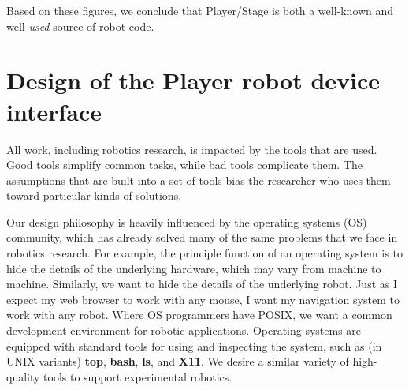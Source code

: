 
Based on these figures, we conclude that Player/Stage is both a
well-known and well-{\it used} source of robot code.

\section{Design of the Player robot device interface}
All work, including robotics research, is impacted by the tools that
are used. Good tools simplify common tasks, while bad tools complicate
them. The assumptions that are built into a set of tools bias the
researcher who uses them toward particular kinds of solutions.

Our design philosophy is heavily influenced by the operating systems
(OS) community, which has already solved many of the same problems
that we face in robotics research.  For example, the principle
function of an operating system is to hide the details of the
underlying hardware, which may vary from machine to machine.
Similarly, we want to hide the details of the underlying robot.  Just
as I expect my web browser to work with any mouse, I want my
navigation system to work with any robot.  Where OS programmers have
POSIX, we want a common development environment for robotic
applications.  Operating systems are equipped with standard tools for
using and inspecting the system, such as (in UNIX variants) {\bf top},
{\bf bash}, {\bf ls}, and {\bf X11}.  We desire a similar variety of
high-quality tools to support experimental robotics.

